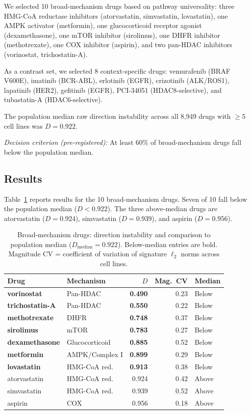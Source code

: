 \documentclass[11pt]{article}
\begin{document}
We selected 10 broad-mechanism drugs based on pathway universality:
three HMG-CoA reductase inhibitors (atorvastatin, simvastatin,
lovastatin), one AMPK activator (metformin), one glucocorticoid
receptor agonist (dexamethasone), one mTOR inhibitor (sirolimus),
one DHFR inhibitor (methotrexate), one COX inhibitor (aspirin), and
two pan-HDAC inhibitors (vorinostat, trichostatin-A).

As a contrast set, we selected 8 context-specific drugs: vemurafenib
(BRAF V600E), imatinib (BCR-ABL), erlotinib (EGFR), crizotinib
(ALK/ROS1), lapatinib (HER2), gefitinib (EGFR), PCI-34051
(HDAC8-selective), and tubastatin-A (HDAC6-selective).

The population median raw direction instability across all 8{,}949 drugs
with $\geq 5$ cell lines was $D = 0.922$.

\emph{Decision criterion (pre-registered):} At least 60\% of broad-mechanism
drugs fall below the population median.

\subsection{Results}

Table~\ref{tab:h2_broad} reports results for the 10 broad-mechanism
drugs.  Seven of 10 fall below the population median ($D < 0.922$).
The three above-median drugs are atorvastatin ($D = 0.924$),
simvastatin ($D = 0.939$), and aspirin ($D = 0.956$).

\begin{table}[htbp]
\centering
\caption{Broad-mechanism drugs: direction instability and comparison to
population median ($D_{\text{median}} = 0.922$).  Below-median entries
are bold.  Magnitude CV = coefficient of variation of signature $\ell_2$
norms across cell lines.}
\label{tab:h2_broad}
\begin{tabular}{@{}llrrl@{}}
\toprule
Drug & Mechanism & $D$ & Mag.\ CV & Median \\
\midrule
\textbf{vorinostat}      & Pan-HDAC       & \textbf{0.490} & 0.23 & Below \\
\textbf{trichostatin-A}  & Pan-HDAC       & \textbf{0.550} & 0.22 & Below \\
\textbf{methotrexate}    & DHFR           & \textbf{0.748} & 0.37 & Below \\
\textbf{sirolimus}       & mTOR           & \textbf{0.783} & 0.27 & Below \\
\textbf{dexamethasone}   & Glucocorticoid & \textbf{0.885} & 0.52 & Below \\
\textbf{metformin}       & AMPK/Complex I & \textbf{0.899} & 0.29 & Below \\
\textbf{lovastatin}      & HMG-CoA red.   & \textbf{0.913} & 0.38 & Below \\
atorvastatin              & HMG-CoA red.   & 0.924 & 0.42 & Above \\
simvastatin               & HMG-CoA red.   & 0.939 & 0.52 & Above \\
aspirin                   & COX            & 0.956 & 0.18 & Above \\
\bottomrule
\end{tabular}
\end{table}
\end{document}

